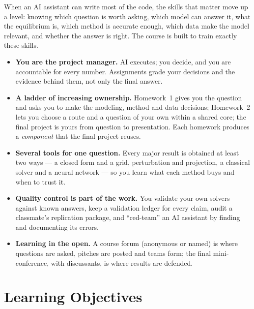 \documentclass[11pt]{article}
\begin{document}
When an AI assistant can write most of the code, the skills that matter move up a level: knowing which question is worth asking, which model can answer it, what the equilibrium is, which method is accurate enough, which data make the model relevant, and whether the answer is right. The course is built to train exactly these skills.
\begin{itemize}
  \item \textbf{You are the project manager.} AI executes; you decide, and you are accountable for every number. Assignments grade your decisions and the evidence behind them, not only the final answer.
  \item \textbf{A ladder of increasing ownership.} Homework~1 gives you the question and asks you to make the modeling, method and data decisions; Homework~2 lets you choose a route and a question of your own within a shared core; the final project is yours from question to presentation. Each homework produces a \emph{component} that the final project reuses.
  \item \textbf{Several tools for one question.} Every major result is obtained at least two ways --- a closed form and a grid, perturbation and projection, a classical solver and a neural network --- so you learn what each method buys and when to trust it.
  \item \textbf{Quality control is part of the work.} You validate your own solvers against known answers, keep a validation ledger for every claim, audit a classmate's replication package, and ``red-team'' an AI assistant by finding and documenting its errors.
  \item \textbf{Learning in the open.} A course forum (anonymous or named) is where questions are asked, pitches are posted and teams form; the final mini-conference, with discussants, is where results are defended.
\end{itemize}

\section{Learning Objectives}
\end{document}
